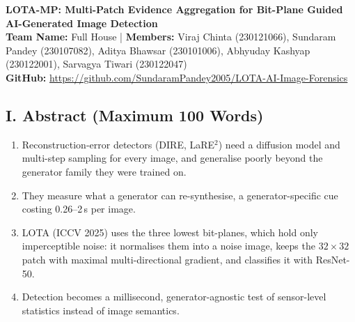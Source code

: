 \documentclass[8pt,a4paper]{article}
\newcommand{\TeamName}{Full House}
\begin{document}
\thispagestyle{empty}

\begin{center}

{\large\bfseries
LOTA-MP: Multi-Patch Evidence Aggregation for Bit-Plane Guided AI-Generated Image Detection}\\[4pt]

\textbf{Team Name:} \TeamName
\quad | \quad
\textbf{Members:}
Viraj Chinta (230121066), Sundaram Pandey (230107082), Aditya Bhawsar (230101006),
Abhyuday Kashyap (230122001), Sarvagya Tiwari (230122047)\\[3pt]

\textbf{GitHub:}
\url{https://github.com/SundaramPandey2005/LOTA-AI-Image-Forensics}

\end{center}

\vspace{-5pt}

\subsection*{I. Abstract (Maximum 100 Words)}
\begin{enumerate}
    \item Reconstruction-error detectors (DIRE, LaRE$^2$) need a diffusion model and multi-step sampling for every image, and generalise poorly beyond the generator family they were trained on.
    \item They measure what a generator can re-synthesise, a generator-specific cue costing 0.26--2\,s per image.
    \item LOTA (ICCV 2025) uses the three lowest bit-planes, which hold only imperceptible noise: it normalises them into a noise image, keeps the $32{\times}32$ patch with maximal multi-directional gradient, and classifies it with ResNet-50.
    \item Detection becomes a millisecond, generator-agnostic test of sensor-level statistics instead of image semantics.
\end{enumerate}

\end{document}
